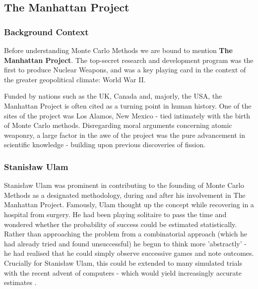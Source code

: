 \documentclass[11pt,a4paper]{article}
\begin{document}
    \subsection{The Manhattan Project}
        \subsubsection{Background Context}
            Before understanding Monte Carlo Methods we are bound to mention \textbf{The Manhattan Project}.
            The top-secret research and development program was the first to produce Nuclear Weapons, and was a key playing card in the context of the greater geopolitical climate: World War II.

            Funded by nations such as the UK, Canada and, majorly, the USA, the Manhattan Project is often cited as a turning point in human history.
            One of the sites of the project was Los Alamos, New Mexico - tied intimately with the birth of Monte Carlo methods.
            Disregarding moral arguments concerning atomic weaponry, a large factor in the awe of the project was the pure advancement in scientific knowledge - 
            building upon previous discoveries of fission.
        \subsubsection{Stanisław Ulam}
            Stanisław Ulam was prominent in contributing to the founding of Monte Carlo Methods as a designated methodology, during and after his involvement in The Manhattan Project.
            Famously, Ulam thought up the concept while recovering in a hospital from surgery. He had been playing solitaire to pass the time and wondered whether the probability of success could be estimated statistically.
            Rather than approaching the problem from a combinatorial approach (which he had already tried and found unsuccessful) he begun to think more 'abstractly' - he had realised that he could simply observe successive games and note outcomes.
            Crucially for Stanisław Ulam, this could be extended to many simulated trials with the recent advent of computers - which would yield increasingly accurate estimates \citep{Eckhardt87}.
\end{document}

